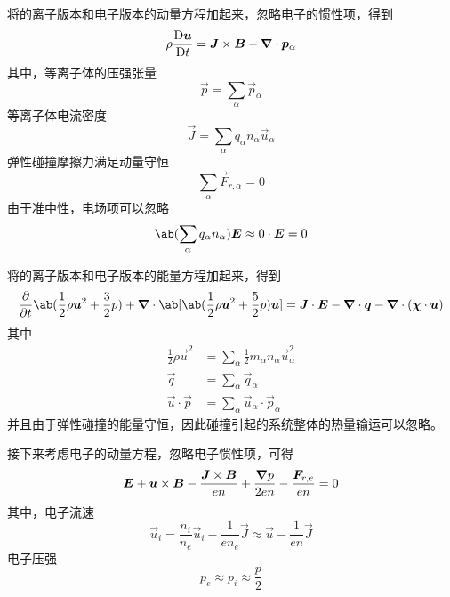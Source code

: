 将的离子版本和电子版本的动量方程加起来，忽略电子的惯性项，得到
\begin{equation}
\rho \mdv{\vec{u}}{t} = \vec{J} \times \vec{B} - \dive{\vec{p}_\alpha}
\end{equation}
其中，等离子体的压强张量
\begin{equation}
    \vec{p} = \sum_\alpha \vec{p}_\alpha
\end{equation}
等离子体电流密度
\begin{equation}
    \vec{J} = \sum_\alpha q_\alpha n_\alpha \vec{u}_\alpha
\end{equation}
弹性碰撞摩擦力满足动量守恒
\begin{equation}
    \sum_\alpha \vec{F}_{r,\alpha} = 0
\end{equation}
由于准中性，电场项可以忽略
\begin{equation}
    \ab( \sum_\alpha q_\alpha n_\alpha ) \vec{E} \approx 0 \cdot \vec{E} = 0
\end{equation}

将的离子版本和电子版本的能量方程加起来，得到
\begin{equation}
\pdv{}{t} \ab(
    \frac{1}{2} \rho \vec{u}^2 + \frac{3}{2} p
)
+ \dive{\ab[\ab(\frac{1}{2} \rho \vec{u}^2 + \frac{5}{2} p ) \vec{u} ]}
= \vec{J} \cdot \vec{E}
- \dive{\vec{q}} - \dive{(\vec{\chi} \cdot \vec{u})}
\end{equation}
其中
\begin{align}
\frac{1}{2} \rho \vec{u}^2 &= \sum_\alpha \frac{1}{2} m_\alpha n_\alpha \vec{u}_\alpha^2 \\
\vec{q} &= \sum_\alpha \vec{q}_\alpha \\
\vec{u} \cdot \vec{p} &= \sum_\alpha \vec{u}_\alpha \cdot \vec{p}_\alpha
\end{align}
并且由于弹性碰撞的能量守恒，因此碰撞引起的系统整体的热量输运可以忽略。

接下来考虑电子的动量方程，忽略电子惯性项，可得
\begin{equation}
\bm{E} + \bm{u} \times \bm{B} - \frac{\bm{J} \times \bm{B}}{e n} + \frac{\bm{\nabla}{p}}{2 e n} - \frac{\bm{F}_{r,e}}{e n} = 0
\end{equation}
其中，电子流速
\begin{equation}
\vec{u}_i = \frac{n_i}{n_e}\vec{u}_i - \frac{1}{e n_e} \vec{J} \approx \vec{u} - \frac{1}{e n} \vec{J}
\end{equation}
电子压强
\begin{equation}
    p_e \approx p_i \approx \frac{p}{2}
\end{equation}

